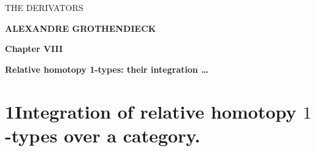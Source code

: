\printedpage{}

\begin{center}
{\Large\textsf{THE DERIVATORS}}

\bigskip

\textbf{ALEXANDRE GROTHENDIECK}

\bigskip\bigskip

\textbf{Chapter VIII}

\medskip

\textbf{Relative homotopy 1-types: their integration \dots}
\end{center}

\clearpage

\printedpage{}


\clearpage



\section*{1\quad Integration of relative homotopy $1$-types over a category.}

